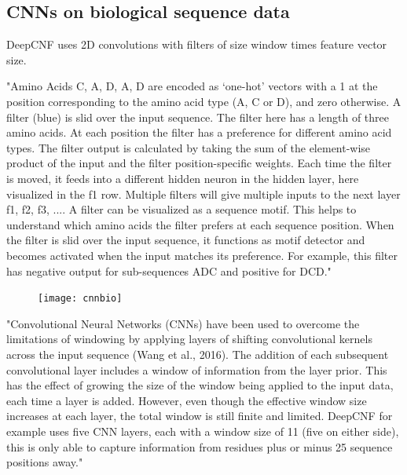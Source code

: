 	\subsection{CNNs on biological sequence data}
	DeepCNF uses 2D convolutions with filters of size window times feature vector size.

	"Amino Acids C, A, D, A, D are encoded as ‘one-hot’ vectors with a 1 at the position corresponding to the amino acid type (A, C or D), and zero otherwise. A filter (blue) is slid over the input sequence. The filter here has a length of three amino acids. At each position the filter has a preference for different amino acid types. The filter output is calculated by taking the sum of the element-wise product of the input and the filter position-specific weights. Each time the filter is moved, it feeds into a different hidden neuron in the hidden layer, here visualized in the f1 row. Multiple filters will give multiple inputs to the next layer {f1, f2, f3, ...}. A filter can be visualized as a sequence motif. This helps to understand which amino acids the filter prefers at each sequence position. When the filter is slid over the input sequence, it functions as motif detector and becomes activated when the input matches its preference. For example, this filter has negative output for sub-sequences ADC and positive for DCD." \cite{Jurtz2017}
	\begin{figure}[h]
		\centering
		\texttt{[image: cnnbio]}
	\end{figure}
		
	"Convolutional Neural Networks (CNNs) have been used to overcome the limitations of windowing by applying layers of shifting convolutional kernels across the input sequence (Wang et al., 2016). The addition of each subsequent convolutional layer includes a window of information from the layer prior. This has the effect of growing the size of the window being applied to the input data, each time a layer is added. However, even though the effective window size increases at each layer, the total window is still finite and limited. DeepCNF for example uses five CNN layers, each with a window size of 11 (five on either side), this is only able to capture information from residues plus or minus 25 sequence positions away." \cite{Heffernan2017}

